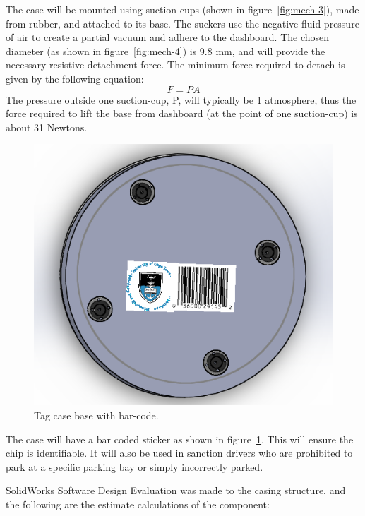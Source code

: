 The case will be mounted using suction-cups (shown in figure~\ref{fig:mech-3}), made from rubber, and attached to its base. The suckers use the negative fluid pressure of air to create a partial vacuum and adhere to the dashboard.\cite{mech-2} The chosen diameter (as shown in figure~\ref{fig:mech-4}) is 9.8 mm, and will provide the necessary resistive detachment force. The minimum force required to detach is given by the following equation:
$$F=PA$$
The pressure outside one suction-cup, P, will typically be 1 atmosphere, thus the force required to lift the base from dashboard (at the point of one suction-cup) is about 31 Newtons.\cite{mech-2}

\newpage
{}
\begin{figure}[H]
\begin{center}
\includegraphics[scale=0.8]{data/mechanical/5.png}
\caption{Tag case base with bar-code.}
\label{fig:mech-5}
\end{center}
\end{figure}

The case will have a bar coded sticker as shown in figure~\ref{fig:mech-5}. This will ensure the chip is identifiable. It will also be used in sanction drivers who are prohibited to park at a specific parking bay or simply incorrectly parked.

SolidWorks Software Design Evaluation was made to the casing structure, and the following are the estimate calculations of the component:

